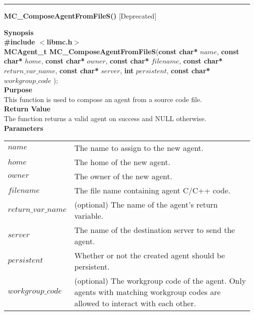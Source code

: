 \noindent
\vspace{5pt}
\rule{6.5in}{0.015in}
\noindent
{}
{\LARGE \bf MC\_ComposeAgentFromFileS()} [Deprecated]\\

\noindent
{\bf Synopsis}\\
{\bf \#include $<$libmc.h$>$}\\
{\bf MCAgent\_t MC\_ComposeAgentFromFileS}({\bf const char*} $name$, 
                                  {\bf const char*} $home$,
                                  {\bf const char*} $owner$,
                                  {\bf const char*} $filename$,
                                  {\bf const char*} $return\_var\_name$,
                                  {\bf const char*} $server$,
                                  {\bf int} $persistent$,
                                  {\bf const char*} $workgroup\_code$
																	);\\

\noindent
{\bf Purpose}\\
This function is used to compose an agent from a source code file.\\

\noindent
{\bf Return Value}\\
The function returns a valid agent on success and NULL otherwise.\\

\noindent
{\bf Parameters}
\vspace{-0.1in}
\begin{description}
\item
\begin{tabular}{p{30 mm}p{125 mm}} 
$name$ & The name to assign to the new agent.\\
$home$ & The home of the new agent.\\
$owner$ & The owner of the new agent.\\
$filename$ & The file name containing agent C/C++ code.\\
$return\_var\_name$ & (optional) The name of the agent's return variable.\\
$server$ & The name of the destination server to send the agent.\\
$persistent$ & Whether or not the created agent should be persistent.\\
$workgroup\_code$ & (optional) The workgroup code of the agent. Only agents with matching workgroup codes are allowed to interact with each other.\\
\end{tabular}
\end{description}

